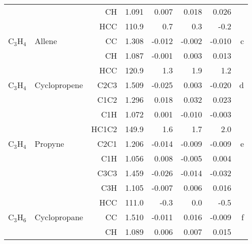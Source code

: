 \begin{table}
\begin{center}
\begin{tabular}{llrrrrrr}
             &                                    &CH            &     1.091   &     0.007 &     0.018 &     0.026 &       \\
             &                                    &HCC         &     110.9   &       0.7 &       0.3 &      -0.2   &       \\
 C$_3$H$_4$        & Allene                             &CC            &     1.308   &    -0.012 &    -0.002 &    -0.010 &     c \\
             &                                    &CH            &     1.087   &    -0.001 &     0.003 &     0.013 &       \\
             &                                    &HCC         &     120.9   &       1.3 &       1.9 &       1.2   &       \\
 C$_3$H$_4$        & Cyclopropene                       &C2C3          &     1.509   &    -0.025 &     0.003 &    -0.020 &     d \\
             &                                    &C1C2          &     1.296   &     0.018 &     0.032 &     0.023 &       \\
             &                                    &C1H           &     1.072   &     0.001 &    -0.010 &    -0.003 &       \\
             &                                    &HC1C2       &     149.9   &       1.6 &       1.7 &       2.0   &       \\
 C$_3$H$_4$        & Propyne                            &C2C1          &     1.206   &    -0.014 &    -0.009 &    -0.009 &     e \\
             &                                    &C1H           &     1.056   &     0.008 &    -0.005 &     0.004 &       \\
             &                                    &C3C3          &     1.459   &    -0.026 &    -0.014 &    -0.032 &       \\
             &                                    &C3H           &     1.105   &    -0.007 &     0.006 &     0.016 &       \\
             &                                    &HCC         &     111.0   &      -0.3 &       0.0 &      -0.5   &       \\
 C$_3$H$_6$        & Cyclopropane                       &CC            &     1.510   &    -0.011 &     0.016 &    -0.009 &     f \\
             &                                    &CH            &     1.089   &     0.006 &     0.007 &     0.015 &       \\

\end{tabular}
\end{center}
\end{table}
